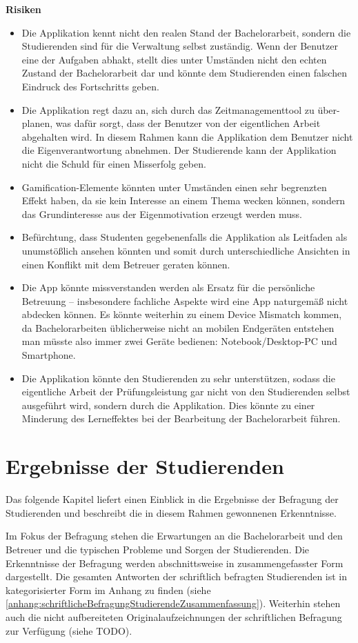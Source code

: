 \documentclass[bibliography=totoc,listof=totoc,BCOR=5mm,DIV=12,oneside]{scrbook}
\begin{document}
\newpage
\par \bigskip \textbf{Risiken}
\begin{itemize}
\item Die Applikation kennt nicht den realen Stand der Bachelorarbeit, sondern die Studierenden sind für die Verwaltung selbst zuständig. Wenn der Benutzer eine der Aufgaben abhakt, stellt dies unter Umständen nicht den echten Zustand der Bachelorarbeit dar und könnte dem Studierenden einen falschen Eindruck des Fortschritts geben.
\item Die Applikation regt dazu an, sich durch das Zeitmanagementtool zu über-planen, was dafür sorgt, dass der Benutzer von der eigentlichen Arbeit abgehalten wird. In diesem Rahmen kann die Applikation dem Benutzer nicht die Eigenverantwortung abnehmen. Der Studierende kann der Applikation nicht die Schuld für einen Misserfolg geben.
\item Gamification-Elemente könnten unter Umständen einen sehr begrenzten Effekt haben, da sie kein Interesse an einem Thema wecken können, sondern das Grundinteresse aus der Eigenmotivation erzeugt werden muss.
\item Befürchtung, dass Studenten gegebenenfalls die Applikation als Leitfaden als unumstößlich ansehen könnten und somit durch unterschiedliche Ansichten in einen Konflikt mit dem Betreuer geraten können.
\item Die App könnte missverstanden werden als Ersatz für die persönliche Betreuung – insbesondere fachliche Aspekte wird eine App naturgemäß nicht abdecken können. Es könnte weiterhin zu einem \qquad Device Mismatch \qquad kommen, da Bachelorarbeiten üblicherweise nicht an mobilen Endgeräten entstehen man müsste also immer zwei Geräte bedienen: Notebook/Desktop-PC und Smartphone.
\item Die Applikation könnte den Studierenden zu sehr unterstützen, sodass die eigentliche Arbeit der Prüfungsleistung gar nicht von den Studierenden selbst ausgeführt wird, sondern durch die Applikation. Dies könnte zu einer Minderung des Lerneffektes bei der Bearbeitung der Bachelorarbeit führen.

\end{itemize}

\newpage
\section{Ergebnisse der Studierenden}
\par Das folgende Kapitel liefert einen Einblick in die Ergebnisse der Befragung der Studierenden und beschreibt die in diesem Rahmen gewonnenen Erkenntnisse.
\par Im Fokus der Befragung stehen die Erwartungen an die Bachelorarbeit und den Betreuer und die typischen Probleme und Sorgen der Studierenden. Die Erkenntnisse der Befragung werden abschnittsweise in zusammengefasster Form dargestellt. Die gesamten Antworten der schriftlich befragten Studierenden ist in kategorisierter Form im Anhang zu finden (siehe \ref{anhang:schriftlicheBefragungStudierendeZusammenfassung}). Weiterhin stehen auch die nicht aufbereiteten Originalaufzeichnungen der schriftlichen Befragung zur Verfügung (siehe TODO).
\end{document}
